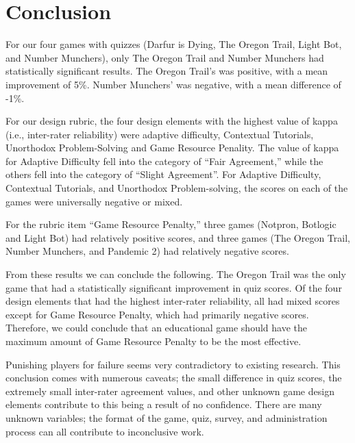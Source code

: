 \documentclass[12pt]{report}
\begin{document}



	


\chapter{Conclusion}
	For our four games with quizzes (Darfur is Dying, The Oregon Trail, Light Bot, and Number Munchers), only The Oregon Trail and Number Munchers had statistically significant results. The Oregon Trail's was positive, with a mean improvement of 5\%. Number Munchers' was negative, with a mean difference of -1\%.

	For our design rubric, the four design elements with the highest value of kappa (i.e., inter-rater reliability) were adaptive difficulty, Contextual Tutorials, Unorthodox Problem-Solving and Game Resource Penality.  The value of kappa for Adaptive Difficulty fell into the category of ``Fair Agreement,'' while the others fell into the category of ``Slight Agreement''. For Adaptive Difficulty, Contextual Tutorials, and Unorthodox Problem-solving, the scores on each of the games were universally negative or mixed.

	For the rubric item ``Game Resource Penalty,'' three games (Notpron, Botlogic and Light Bot) had relatively positive scores, and three games (The Oregon Trail, Number Munchers, and Pandemic 2) had relatively negative scores.

	From these results we can conclude the following.  The Oregon Trail was the only game that had a statistically significant improvement in quiz scores.  Of the four design elements that had the highest inter-rater reliability, all had mixed scores except for Game Resource Penalty, which had primarily negative scores.  Therefore, we could conclude that an educational game should have the maximum amount of Game Resource Penalty to be the most effective.
	
	Punishing players for failure seems very contradictory to existing research. This conclusion comes with numerous caveats; the small difference in quiz scores, the extremely small inter-rater agreement values, and other unknown game design elements contribute to this being a result of no confidence. There are many unknown variables; the format of the game, quiz, survey, and administration process can all contribute to inconclusive work.
\end{document}
